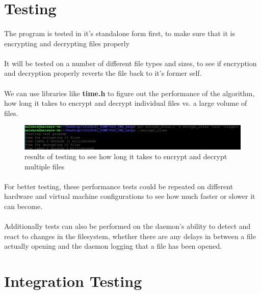 \documentclass{article}
\begin{document}
\section{Testing}
    \paragraph{}The program is tested in it's standalone form first, to make sure that it is encrypting and decrypting files properly
    \paragraph{}It will be tested on a number of different file types and sizes, to see if encryption and decryption properly reverts the file back to it's former self.
    \paragraph{}We can use libraries like \textbf{time.h} to figure out the performance of the algorithm, how long it takes to encrypt and decrypt individual files vs. a large volume of files.
    \begin{figure}[htbp]
        \centering\includegraphics[width=\textwidth]{encrypt_test.png}
        \caption{results of testing to see how long it takes to encrypt and decrypt multiple files}
        \label{fig:my_label}
    \end{figure}
    \paragraph{}For better testing, these performance tests could be repeated on different hardware and virtual machine configurations to see how much faster or slower it can become.
    \paragraph{}Additionally tests can also be performed on the daemon's ability to detect and react to changes in the filesystem, whether there are any delays in between a file actually opening and the daemon logging that a file has been opened.

\section{Integration Testing}
\end{document}
